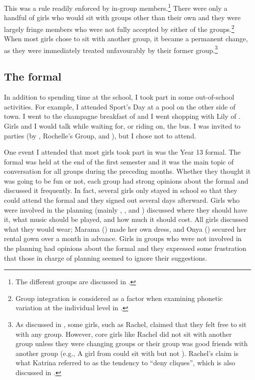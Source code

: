 This was a rule readily enforced by in-group members.\footnote{The different groups are discussed in .}  There were only a handful of girls who would sit with groups other than their own and they were largely fringe members who were not fully accepted by either of the groups.\footnote{Group integration is considered as a factor when examining phonetic variation at the individual level in .}  When most girls chose to sit with another group, it became a permanent change, as they were immediately treated unfavourably by their former group.\footnote{As discussed in , some girls, such as Rachel, claimed that they felt free to sit with any group. However, core girls like Rachel did not sit with another group unless they were changing groups or their group was good friends with another group (e.g., A girl from  could sit with  but not ). Rachel's claim is what Katrina referred to as the tendency to ``deny cliques'', which is also discussed in .}  



\subsection{The formal}

In addition to spending time at the school, I took part in some out-of-school activities. For example, I attended Sport's Day at a pool on the other side of town. I went to the champagne breakfast of  and I went shopping with Lily of . Girls and I would talk while waiting for, or riding on, the bus. I was invited to parties (by , Rochelle's Group, and ), but I chose not to attend. 

One event I attended that most girls took part in was the Year 13 formal. The formal was held at the end of the first semester and it was the main topic of conversation for all groups during the preceding months. Whether they thought it was going to be fun or not, each group had strong opinions about the formal and discussed it frequently. In fact, several girls only stayed in school so that they could attend the formal and they signed out several days afterward. Girls who were involved in the planning (mainly , , and ) discussed where they should have it, what music should be played, and how much it should cost. All girls discussed what they would wear; Marama () made her own dress, and Onya () secured her rental gown over a month in advance. Girls in groups who were not involved in the planning had opinions about the formal and they expressed some frustration that those in charge of planning seemed to ignore their suggestions.

